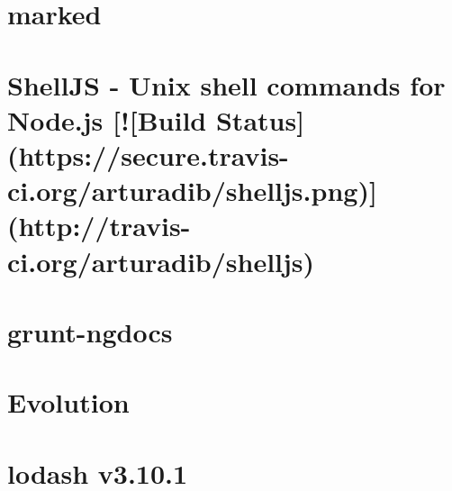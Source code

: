 \documentclass[twoside]{book}
\newcommand{\+}{\discretionary{\mbox{\scriptsize$\hookleftarrow$}}{}{}}
\begin{document}
\chapter{marked}
\label{md__c_1__users_martin__documents__git_hub_visual_studio__bachelor__wis_r__wis_r_node_modules_gru9fd0dc9cff9edf36b7fffdf483014a90}
\hypertarget{md__c_1__users_martin__documents__git_hub_visual_studio__bachelor__wis_r__wis_r_node_modules_gru9fd0dc9cff9edf36b7fffdf483014a90}{}

\chapter{Shell\+J\+S -\/ Unix shell commands for Node.\+js \mbox{[}!\mbox{[}Build Status\mbox{]}(https\+://secure.travis-\/ci.org/arturadib/shelljs.png)\mbox{]}(http\+://travis-\/ci.org/arturadib/shelljs)}
\label{md__c_1__users_martin__documents__git_hub_visual_studio__bachelor__wis_r__wis_r_node_modules_gru38e71be7e9692298d5b7c578950294c4}
\hypertarget{md__c_1__users_martin__documents__git_hub_visual_studio__bachelor__wis_r__wis_r_node_modules_gru38e71be7e9692298d5b7c578950294c4}{}

\chapter{grunt-\/ngdocs}
\label{md__c_1__users_martin__documents__git_hub_visual_studio__bachelor__wis_r__wis_r_node_modules_grunt-ngdocs__r_e_a_d_m_e}
\hypertarget{md__c_1__users_martin__documents__git_hub_visual_studio__bachelor__wis_r__wis_r_node_modules_grunt-ngdocs__r_e_a_d_m_e}{}

\chapter{Evolution}
\label{md__c_1__users_martin__documents__git_hub_visual_studio__bachelor__wis_r__wis_r_node_modules_gru501f35b1c70bfaf0b8a4ceec2c94de6a}
\hypertarget{md__c_1__users_martin__documents__git_hub_visual_studio__bachelor__wis_r__wis_r_node_modules_gru501f35b1c70bfaf0b8a4ceec2c94de6a}{}

\chapter{lodash v3.10.1}
\label{md__c_1__users_martin__documents__git_hub_visual_studio__bachelor__wis_r__wis_r_node_modules_gru5343111272a46e988735b3d0bf6c2997}
\hypertarget{md__c_1__users_martin__documents__git_hub_visual_studio__bachelor__wis_r__wis_r_node_modules_gru5343111272a46e988735b3d0bf6c2997}{}

\end{document}
